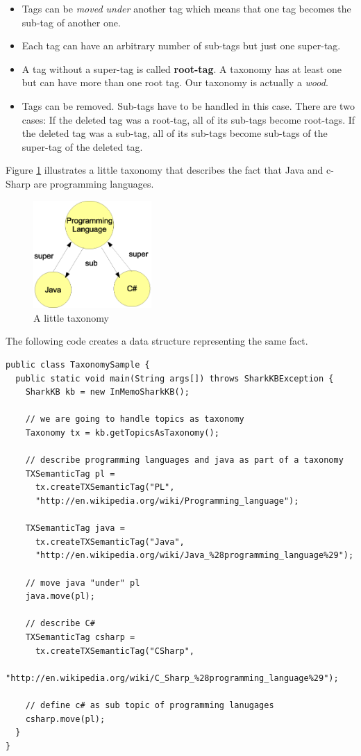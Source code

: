 \begin{itemize}
    \item
Tags can be {\it moved under} another tag which means that one tag becomes the sub-tag of another one.

    \item
Each tag can have an arbitrary number of sub-tags but just one super-tag.

    \item
A tag without a super-tag is called {\bf root-tag}. A taxonomy has at least one but can have more than one root tag. Our taxonomy is actually a {\it wood}.

    \item
Tags can be removed. Sub-tags have to be handled in this case. There are two cases: If the deleted tag was a root-tag, all of its sub-tags become root-tags. If the deleted tag was a sub-tag, all of its sub-tags become sub-tags of the super-tag of the deleted tag.

\end{itemize}

Figure \ref{fig:taxonomy} illustrates a little taxonomy that describes the fact that Java and c-Sharp are programming languages.

\begin{figure}[t]
\centering
\includegraphics[width=0.40\textwidth]{taxonomy.eps}
\caption{A little taxonomy}
\label{fig:taxonomy}
\end{figure}

The following code creates a data structure representing the same fact.

\begin{verbatim}
public class TaxonomySample {
  public static void main(String args[]) throws SharkKBException {
    SharkKB kb = new InMemoSharkKB();

    // we are going to handle topics as taxonomy
    Taxonomy tx = kb.getTopicsAsTaxonomy();

    // describe programming languages and java as part of a taxonomy
    TXSemanticTag pl =
      tx.createTXSemanticTag("PL",
      "http://en.wikipedia.org/wiki/Programming_language");

    TXSemanticTag java =
      tx.createTXSemanticTag("Java",
      "http://en.wikipedia.org/wiki/Java_%28programming_language%29");

    // move java "under" pl
    java.move(pl);

    // describe C#
    TXSemanticTag csharp =
      tx.createTXSemanticTag("CSharp",
      "http://en.wikipedia.org/wiki/C_Sharp_%28programming_language%29");

    // define c# as sub topic of programming lanugages
    csharp.move(pl);
  }
}
\end{verbatim}

